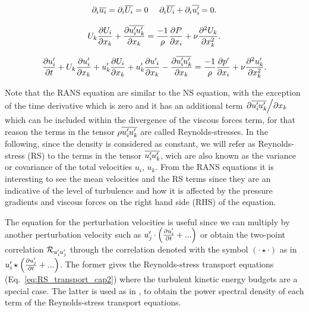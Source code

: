 \begin{equation}
    \label{eq:cont_decomp}
    \partial_i \overline{u_i} = \partial_i \overline{U_i} = 0 ~~~~
    \partial_i \overline{U_i} + \partial_i \overline{u_i^{\prime}\mkern-1.2mu} = 0.  
\end{equation}

\begin{equation}
    \label{eq:RANS_cap2}
    U_k\pdv{U_i}{x_k} + \pdv{\overline{u_i^{\prime}\mkern-1.2muu_k^{\prime}\mkern-1.2mu}}{x_k} = \frac {-1} {\rho} \frac {\partial P}{\partial x_i} + \nu  \frac {\partial^2 U_k} {\partial x_k^2}.
\end{equation}

\begin{equation}
    \label{eq:pertub_cap2}
    {\pdv{u_i^{\prime}\mkern-1.2mu}{t} + 
    U_k\pdv{u_i^{\prime}\mkern-1.2mu}{x_k} + u_k^{\prime}\mkern-1.2mu\pdv{U_i}{x_k} + u_k^{\prime}\mkern-1.2mu\pdv{u^{\prime}\mkern-1.2mu_i}{x_k} - \pdv{\overline{u_i^{\prime}\mkern-1.2muu_k^{\prime}\mkern-1.2mu}}{x_k}  =
    \frac {-1} {\rho} \pdv{p^{\prime}\mkern-1.2mu}{x_i} + \nu  \frac {\partial^2 u_k^{\prime}\mkern-1.2mu} {\partial x_k^2}    }.
\end{equation}

Note that the RANS equation are similar to the NS equation, with the exception of the time derivative which is zero and it has an additional term $\pdv{\overline{u_i^{\prime}\mkern-1.2muu_k^{\prime}\mkern-1.2mu}}/{x_k}$ which can be included within the divergence of the viscous forces term, for that reason the terms in the tensor $\rho \overline{u_i^{\prime}\mkern-1.2mu u_k^{\prime}\mkern-1.2mu}$ are called Reynolds-stresses. In the following, since the density is considered as constant, we will refer as Reynolds-stress (RS) to the terms in the tensor $\overline{u_i^{\prime}\mkern-1.2mu u_k^{\prime}\mkern-1.2mu}$, wich are also known as the variance or covariance of the total velocities $u_i$, $u_k$.
From the RANS equations it is interesting to see the mean velocities and the RS terms since they are an indicative of the level of turbulence and how it is affected by the pressure gradients and viscous forces on the right hand side (RHS) of the equation.

The equation for the perturbation velocities is useful since we can multiply by another perturbation velocity such as $u_{j}^{\prime}\mkern-1.2mu \cdot \left( \pdv{u_{i}^{\prime}\mkern-1.2mu}{t} + ... \right) $ or obtain the two-point correlation $\mathcal{R}_{u_i^{\prime}\mkern-1.2mu u_j^{\prime}\mkern-1.2mu}$ through the correlation denoted with the symbol $(\cdot \star \cdot)$ as in $ u_{i}^{\prime}\mkern-1.2mu \star \left( \pdv{u_{j}^{\prime}\mkern-1.2mu}{t} + ... \right)$. The former gives the Reynolds-stress transport equations (Eq.~\ref{eq:RS_transport_cap2}) where the turbulent kinetic energy budgets are a special case. The latter is used as in \cite{lee_moser_2019}, to obtain the power spectral density of each term of the Reynolds-stress transport equations.

